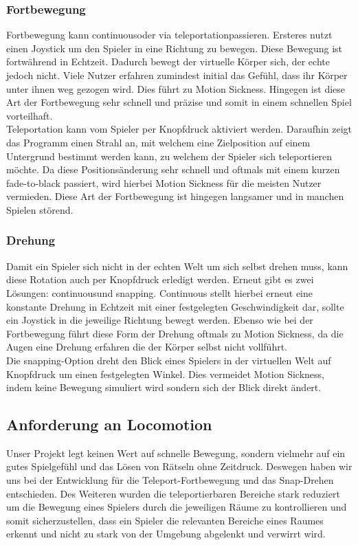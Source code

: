 \subsubsection{Fortbewegung}
Fortbewegung kann \dq continuous\dq oder via \dq teleportation\dq passieren. Ersteres nutzt einen Joystick um den Spieler in eine Richtung zu bewegen. Diese Bewegung ist fortwährend in Echtzeit. Dadurch bewegt der virtuelle Körper sich, der echte jedoch nicht. Viele Nutzer erfahren zumindest initial das Gefühl, dass ihr Körper unter ihnen weg gezogen wird. Dies führt zu Motion Sickness. Hingegen ist diese Art der Fortbewegung sehr schnell und präzise und somit in einem schnellen Spiel vorteilhaft.\\

Teleportation kann vom Spieler per Knopfdruck aktiviert werden. Daraufhin zeigt das Programm einen Strahl an, mit welchem eine Zielposition auf einem Untergrund bestimmt werden kann, zu welchem der Spieler sich teleportieren möchte. Da diese Positionsänderung sehr schnell und oftmals mit einem kurzen fade-to-black passiert, wird hierbei Motion Sickness für die meisten Nutzer vermieden. Diese Art der Fortbewegung ist hingegen langsamer und in manchen Spielen störend.

\subsubsection{Drehung}
Damit ein Spieler sich nicht in der echten Welt um sich selbst drehen muss, kann diese Rotation auch per Knopfdruck erledigt werden. Erneut gibt es zwei Lösungen: \dq continuous\dq und \dq snapping\dq. Continuous stellt hierbei erneut eine konstante Drehung in Echtzeit mit einer festgelegten Geschwindigkeit dar, sollte ein Joystick in die jeweilige Richtung bewegt werden. Ebenso wie bei der Fortbewegung führt diese Form der Drehung oftmals zu Motion Sickness, da die Augen eine Drehung erfahren die der Körper selbst nicht vollführt.\\

Die snapping-Option dreht den Blick eines Spielers in der virtuellen Welt auf Knopfdruck um einen festgelegten Winkel. Dies vermeidet Motion Sickness, indem keine Bewegung simuliert wird sondern sich der Blick direkt ändert.


\subsection{Anforderung an Locomotion}
Unser Projekt legt keinen Wert auf schnelle Bewegung, sondern vielmehr auf ein gutes Spielgefühl und das Lösen von Rätseln ohne Zeitdruck. Deswegen haben wir uns bei der Entwicklung für die Teleport-Fortbewegung und das Snap-Drehen entschieden. Des Weiteren wurden die teleportierbaren Bereiche stark reduziert um die Bewegung eines Spielers durch die jeweiligen Räume zu kontrollieren und somit sicherzustellen, dass ein Spieler die relevanten Bereiche eines Raumes erkennt und nicht zu stark von der Umgebung abgelenkt und verwirrt wird.






